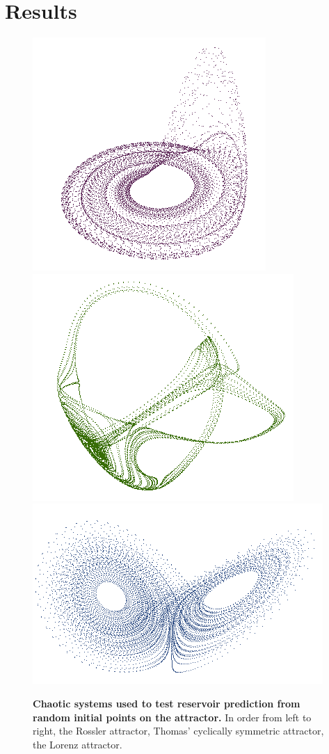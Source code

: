\documentclass[journal]{journal}
\begin{document}
\section{Results}
\begin{figure}[h]
\centering
\includegraphics[scale=0.2]{Images/rosslerattractor.png}
\includegraphics[scale=0.2]{Images/thomasattractor.png}
\includegraphics[scale=0.2]{Images/lorenzattractor.png}
\caption{\textbf{Chaotic systems used to test reservoir prediction from random initial points on the attractor.} In order from left to right, the Rossler attractor, Thomas' cyclically symmetric attractor, the Lorenz attractor.}
\end{figure}
\end{document}
